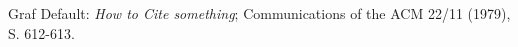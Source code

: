         Graf Default: {\sl How to Cite something}; 
        Communications of the ACM 22/11 (1979), S. 612-613.
